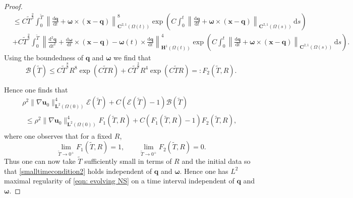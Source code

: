 \documentclass[a4paper]{amsart}
\numberwithin{equation}{section}
\newcommand{\grad}{\nabla}
\theoremstyle{plain}
\newcommand{\mbf}[1]{\mathbf{#1}}
\begin{document}
\begin{proof}
\begin{align*}
        &\leq C\widetilde{T}^{\frac{2}{3}} \int_0^{\widetilde{T}} \left\| \frac{\mathrm{d}\mbf{q}}{\mathrm{d}t} + \boldsymbol{\omega} \times (\mbf{x} - \mbf{q}) \right\|_{\mbf{C}^{2,1}(\Omega(t))}^8 \exp \left( C \int_0^t \left\| \frac{\mathrm{d}\mbf{q}}{\mathrm{d}t} + \boldsymbol{\omega} \times (\mbf{x} - \mbf{q}) \right\|_{\mbf{C}^{2,1}(\Omega(s))} \, \mathrm{d}s \right)\\
        &+ C\widetilde{T}^{\frac{2}{3}}\int_0^{\widetilde{T}} \left\| \frac{\mathrm{d}^2\mbf{q}}{\mathrm{d}t^2} + \frac{\mathrm{d}\boldsymbol{\omega}}{\mathrm{d}t}\times(\mbf{x} - \mbf{q}) - \boldsymbol{\omega}(t) \times \frac{\mathrm{d}\mbf{q}}{\mathrm{d}t} \right\|_{\mbf{H}^1(\Omega(t))}^4 \exp \left( C \int_0^t \left\| \frac{\mathrm{d}\mbf{q}}{\mathrm{d}t} + \boldsymbol{\omega} \times (\mbf{x} - \mbf{q}) \right\|_{\mbf{C}^{2,1}(\Omega(s))} \, \mathrm{d}s \right).
    \end{align*}
    Using the boundedness of $\mbf{q}$ and $\boldsymbol{\omega}$ we find that
    \[ \mathcal{B}(\widetilde{T}) \leq C\widetilde{T}^{\frac{8}{3}} R^8 \exp(C\widetilde{T}R) + C\widetilde{T}^{\frac{2}{3}} R^4 \exp(C \widetilde{T}R) =: F_2(\widetilde{T}, R). \]

    Hence one finds that
    \begin{multline*}
        \rho^2 \| \grad \mbf{u}_0\|_{\mbf{L}^2(\Omega(0))}^4 \mathcal{E}(\widetilde{T}) + C (\mathcal{E}(\widetilde{T}) -1) \mathcal{B}(\widetilde{T})\\
        \begin{aligned}
        \leq \rho^2 \| \grad \mbf{u}_0\|_{\mbf{L}^2(\Omega(0))}^4 F_1(\widetilde{T}, R)+ C \left( F_1(\widetilde{T}, R) - 1 \right)F_2(\widetilde{T}, R),
        \end{aligned}
    \end{multline*}
    where one observes that for a fixed $R$,
    \[ \lim_{\widetilde{T} \rightarrow 0^+} F_1(\widetilde{T}, R) = 1, \qquad \lim_{\widetilde{T} \rightarrow 0^+} F_2(\widetilde{T}, R) = 0. \]
    Thus one can now take $\widetilde{T}$ sufficiently small in terms of $R$ and the initial data so that \eqref{smalltimecondition2} holds independent of $\mbf{q} $ and $ \boldsymbol{\omega}$.
    Hence one has $L^2$ maximal regularity of \eqref{eqn: evolving NS} on a time interval independent of $\mbf{q}$ and $\boldsymbol{\omega}$.


\end{proof}
\end{document}
